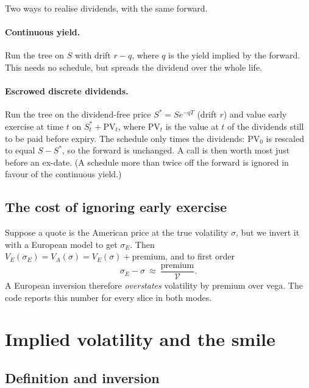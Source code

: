 \documentclass[11pt]{article}
\begin{document}
Two ways to realise dividends, with the same forward.

\paragraph{Continuous yield.} Run the tree on $S$ with drift $r-q$, where $q$ is
the yield implied by the forward. This needs no schedule, but spreads the
dividend over the whole life.

\paragraph{Escrowed discrete dividends.} Run the tree on the dividend-free
price $S^*=Se^{-qT}$ (drift $r$) and value early exercise at time $t$ on
$S^*_t+\mathrm{PV}_t$, where $\mathrm{PV}_t$ is the value at $t$ of the
dividends still to be paid before expiry. The schedule only times the
dividends: $\mathrm{PV}_0$ is rescaled to equal $S-S^*$, so the forward is
unchanged. A call is then worth most just before an ex-date. (A schedule more
than twice off the forward is ignored in favour of the continuous yield.)

\subsection{The cost of ignoring early exercise}

Suppose a quote is the American price at the true volatility $\sigma$, but we
invert it with a European model to get $\sigma_E$. Then
$V_E(\sigma_E)=V_A(\sigma)=V_E(\sigma)+\mathrm{premium}$, and to first order
\begin{equation}\label{eq:bias}
  \sigma_E-\sigma\ \approx\ \frac{\mathrm{premium}}{\mathcal V}.
\end{equation}
A European inversion therefore \emph{overstates} volatility by premium over vega.
The code reports this number for every slice in both modes.

\section{Implied volatility and the smile}\label{sec:smile}

\subsection{Definition and inversion}\label{sec:iv}
\end{document}
